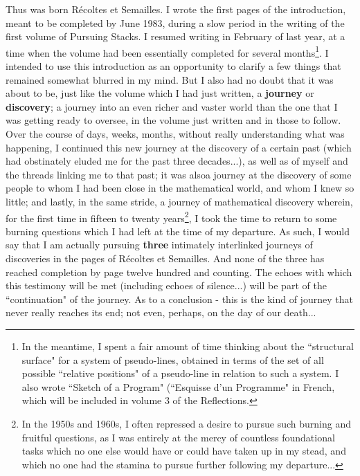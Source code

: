 Thus was born R\'ecoltes et Semailles. I wrote the first pages of the introduction, meant to be completed by June 1983, during a slow period in the writing of the first volume of Pursuing Stacks. I resumed writing in February of last year, at a time when the volume had been essentially completed for several months\footnote{In the meantime, I spent a fair amount of time thinking about the ``structural surface" for a system of pseudo-lines, obtained in terms of the set of all possible ``relative positions" of a pseudo-line in relation to such a system. I also wrote ``Sketch of a Program" (``Esquisse d'un Programme" in French, which will be included in volume 3 of the Reflections.}. I intended to use this introduction as an opportunity to clarify a few things that remained somewhat blurred in my mind. But I also had no doubt that it was about to be, just like the volume which I had just written, a \textbf{journey} or \textbf{discovery}; a journey into an even richer and vaster world than the one that I was getting ready to oversee, in the volume just written and in those to follow. Over the course of days, weeks, months, without really understanding what was happening, I continued this new journey at the discovery of a certain past (which had obstinately eluded me for the past three decades...), as well as of myself and the threads linking me to that past; it was alsoa journey at the discovery of some people to whom I had been close in the mathematical world, and whom I knew so little; and lastly, in the same stride, a journey of mathematical discovery wherein, for the first time in fifteen to twenty years\footnote{In the 1950s and 1960s, I often repressed a desire to pursue such burning and fruitful questions, as I was entirely at the mercy of countless foundational tasks which no one else would have or could have taken up in my stead, and which no one had the stamina to pursue further following my departure... }, I took the time to return to some burning questions which I had left at the time of my departure. As such, I would say that I am actually pursuing \textbf{three} intimately interlinked journeys of discoveries in the pages of R\'ecoltes et Semailles. And none of the three has reached completion by page twelve hundred and counting. The echoes with which this testimony will be met (including echoes of silence...) will be part of the ``continuation" of the journey. As to a conclusion - this is the kind of journey that never really reaches its end; not even, perhaps, on the day of our death...


